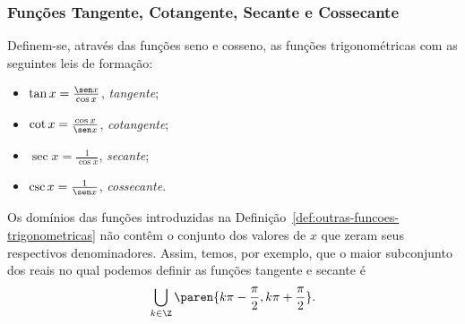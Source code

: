 \subsubsection{Funções Tangente, Cotangente, Secante e Cossecante}

\begin{definition}
\label{def:outras-funcoes-trigonometricas}
    Definem-se, através das funções seno e cosseno, as funções
trigonométricas com as seguintes leis de formação:
\begin{itemize}
  \item $\tan x = \frac {\sen x}{\cos x}$, \emph{tangente};
  \item $\cot x = \frac {\cos x}{\sen x}$, \emph{cotangente};
  \item $\sec x = \frac {1}{\cos x}$, \emph{secante};
  \item $\csc x = \frac {1}{\sen x}$, \emph{cossecante}.
\end{itemize}
\end{definition}

\begin{remark}
    Os domínios das funções introduzidas na Definição~\ref{def:outras-funcoes-trigonometricas} não contêm o conjunto dos valores de $x$
que zeram seus respectivos denominadores. Assim, temos, por exemplo, que o maior subconjunto dos reais no qual podemos definir
as funções tangente e secante é $$\bigcup_{k \in \Z} \paren{k \pi -
\frac {\pi} 2, k \pi + \frac {\pi} 2}.$$
\end{remark}